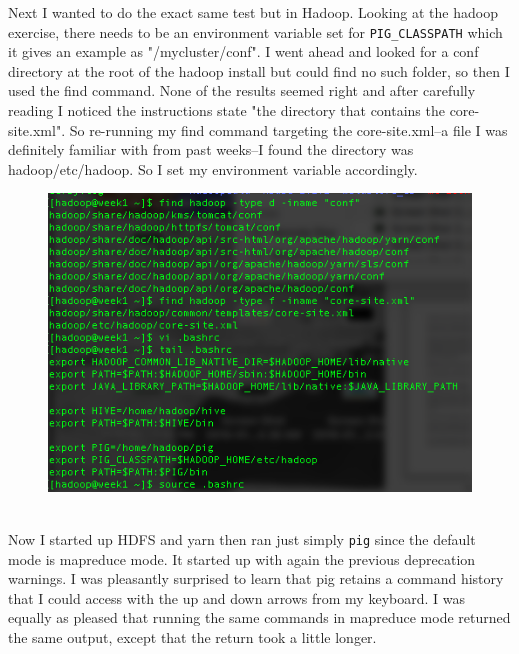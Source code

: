 \documentclass[10pt]{article}
\begin{document}
\par
Next I wanted to do the exact same test but in Hadoop. Looking at the hadoop exercise, there needs to be an environment variable set for \verb|PIG_CLASSPATH| which it gives an example as "/mycluster/conf". I went ahead and looked for a conf directory at the root of the hadoop install but could find no such folder, so then I used the find command. None of the results seemed right and after carefully reading I noticed the instructions state "the directory that contains the core-site.xml". So re-running my find command targeting the core-site.xml--a file I was definitely familiar with from past weeks--I found the directory was hadoop/etc/hadoop. So I set my environment variable accordingly.
\begin{figure}[!h]
\includegraphics[scale=0.37]{env.png}
\centering
\end{figure}\\
\indent Now I started up HDFS and yarn then ran just simply \verb|pig| since the default mode is mapreduce mode. It started up with again the previous deprecation warnings. I was pleasantly surprised to learn that pig retains a command history that I could access with the up and down arrows from my keyboard. I was equally as pleased that running the same commands in mapreduce mode returned the same output, except that the return took a little longer.
\par
{}%
\end{document}
